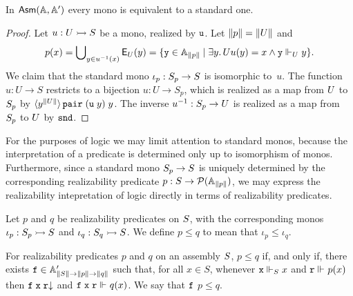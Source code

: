\begin{proposition}
  In $\AsmA$ every mono is equivalent to a standard one.
\end{proposition}

\begin{proof}
  Let $u : \asm{U} \monoto \asm{S}$ be a mono, realized by $\R{u}$.
  Let $\T{p} = \T{U}$ and
  \begin{equation*}
    p(x) = \tbigcup_{y \in \inv{u}(x)} \Ex_U(y) =
    \set{\R{y} \in \Atyp{\T{p}} \such \some{y}{U}{u(y) = x \land \R{y} \rz[U] y}}.
  \end{equation*}
  We claim that the standard mono $\iota_p : \asm{S}_p \to \asm{S}$ is
  isomorphic to~$u$. The function $u : U \to S$ restricts to a
  bijection $u : U \to S_p$, which is realized as a map from $\asm{U}$
  to $\asm{S}_p$ by
  $\tpcalam{y}{\T{U}} \combPair\;(\R{u}\;y)\;y$. The inverse
  $\inv{u} : S_p \to U$ is realized as a map from $\asm{S}_p$ to
  $\asm{U}$ by $\combSnd$.
\end{proof}

For the purposes of logic we may limit attention to standard monos,
because the interpretation of a predicate is determined only up to
isomorphism of monos. Furthermore, since a standard mono $\asm{S}_p
\to \asm{S}$ is uniquely determined by the corresponding realizability
predicate $p : S \to \pow{\Atyp{\T{p}}}$, we may express the
realizability intepretation of logic directly in terms of
realizability predicates.

Let $p$ and $q$ be realizability predicates on $\asm{S}$, with the
corresponding monos $\iota_p : \asm{S}_p \monoto \asm{S}$ and $\iota_q
: \asm{S}_q \monoto \asm{S}$. We define $p \leq q$ to mean that
$\iota_p \leq \iota_q$.

\begin{lemma}
  \label{lemma:realizability-predicate-leq}%
  For realizability predicates $p$ and $q$ on an assembly $\asm{S}$,
  $p \leq q$ if, and only if, there exists $\R{f} \in \subAtyp{\T{S}
    \to \T{p} \to \T{q}}$ such that, for all $x \in S$, whenever $\R{x}
  \rz[S] x$ and $\R{r} \rz p(x)$ then $\defined{\R{f}\;\R{x}\;\R{r}}$
  and $\R{f}\;\R{x}\;\R{r} \rz q(x)$. We say that $\R{f}$
   $p \leq q$.
\end{lemma}

